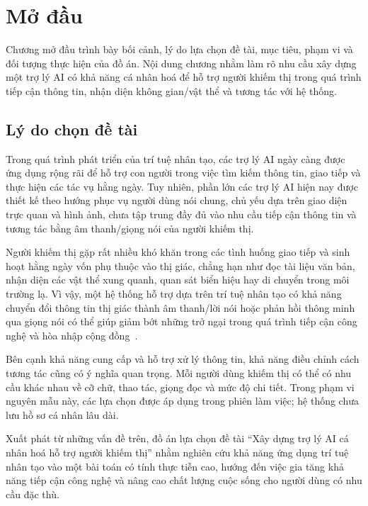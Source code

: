 \chapter{Mở đầu}
\label{ch:modau}

\begin{muctieu}
Chương mở đầu trình bày bối cảnh, lý do lựa chọn đề tài, mục tiêu, phạm vi
và đối tượng thực hiện của đồ án. Nội dung chương nhằm làm rõ nhu cầu xây
dựng một trợ lý AI có khả năng cá nhân hoá để hỗ trợ người khiếm thị trong
quá trình tiếp cận thông tin, nhận diện không gian/vật thể và tương tác với hệ thống.
\end{muctieu}

\section{Lý do chọn đề tài}

Trong quá trình phát triển của trí tuệ nhân tạo, các trợ lý AI ngày càng
được ứng dụng rộng rãi để hỗ trợ con người trong việc tìm kiếm thông tin,
giao tiếp và thực hiện các tác vụ hằng ngày. Tuy nhiên, phần lớn các trợ lý
AI hiện nay được thiết kế theo hướng phục vụ người dùng nói chung, chủ yếu dựa
trên giao diện trực quan và hình ảnh, chưa tập trung đầy đủ vào nhu cầu tiếp
cận thông tin và tương tác bằng âm thanh/giọng nói của người khiếm thị.

Người khiếm thị gặp rất nhiều khó khăn trong các tình huống giao tiếp và sinh
hoạt hằng ngày vốn phụ thuộc vào thị giác, chẳng hạn như đọc tài liệu văn bản,
nhận diện các vật thể xung quanh, quan sát biển hiệu hay di chuyển trong môi
trường lạ. Vì vậy, một hệ thống hỗ trợ dựa trên trí tuệ nhân tạo có khả năng
chuyển đổi thông tin thị giác thành âm thanh/lời nói hoặc phản hồi thông minh
qua giọng nói có thể giúp giảm bớt những trở ngại trong quá trình tiếp cận công nghệ
và hòa nhập cộng đồng~\cite{WHO2019WorldVision,WHO2022AssistiveTech}.

Bên cạnh khả năng cung cấp và hỗ trợ xử lý thông tin, khả năng điều chỉnh cách
tương tác cũng có ý nghĩa quan trọng. Mỗi người dùng khiếm thị có thể có nhu cầu
khác nhau về cỡ chữ, thao tác, giọng đọc và mức độ chi tiết. Trong phạm vi
nguyên mẫu này, các lựa chọn được áp dụng trong phiên làm việc; hệ thống chưa
lưu hồ sơ cá nhân lâu dài.

Xuất phát từ những vấn đề trên, đồ án lựa chọn đề tài ``Xây dựng trợ lý AI
cá nhân hoá hỗ trợ người khiếm thị'' nhằm nghiên cứu khả năng ứng dụng
trí tuệ nhân tạo vào một bài toán có tính thực tiễn cao, hướng đến việc gia tăng
khả năng tiếp cận công nghệ và nâng cao chất lượng cuộc sống cho người dùng có
nhu cầu đặc thù.

